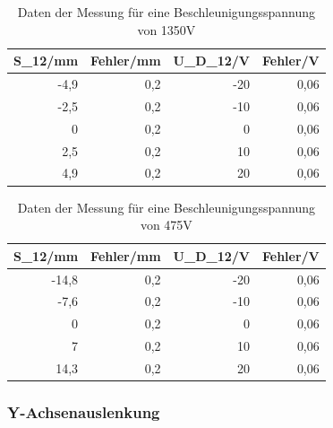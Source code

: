 \documentclass[12pt]{scrartcl}
\begin{document}
\begin{table}[htbp]
\caption{Daten der Messung für eine Beschleunigungsspannung von 1350V}
\begin{center}
\begin{tabular}{|r|r|r|r|}
\hline
\multicolumn{1}{|l|}{S\_12/mm} & \multicolumn{1}{l|}{Fehler/mm} & \multicolumn{1}{l|}{U\_D\_12/V} & \multicolumn{1}{l|}{Fehler/V} \\ \hline
-4,9 & 0,2 & -20 & 0,06 \\ \hline
-2,5 & 0,2 & -10 & 0,06 \\ \hline
0 & 0,2 & 0 & 0,06 \\ \hline
2,5 & 0,2 & 10 & 0,06 \\ \hline
4,9 & 0,2 & 20 & 0,06 \\ \hline
\end{tabular}
\end{center}
\label{tab:materialeigenschaften}
\end{table}




\begin{table}[htbp]
\caption{Daten der Messung für eine Beschleunigungsspannung von 475V}
\begin{center}
\begin{tabular}{|r|r|r|r|}
\hline
\multicolumn{1}{|l|}{S\_12/mm} & \multicolumn{1}{l|}{Fehler/mm} & \multicolumn{1}{l|}{U\_D\_12/V} & \multicolumn{1}{l|}{Fehler/V} \\ \hline
-14,8 & 0,2 & -20 & 0,06 \\ \hline
-7,6 & 0,2 & -10 & 0,06 \\ \hline
0 & 0,2 & 0 & 0,06 \\ \hline
7 & 0,2 & 10 & 0,06 \\ \hline
14,3 & 0,2 & 20 & 0,06 \\ \hline
\end{tabular}
\end{center}
\label{tab:materialeigenschaften}
\end{table}

\newpage

\subsubsection{Y-Achsenauslenkung}
\end{document}
